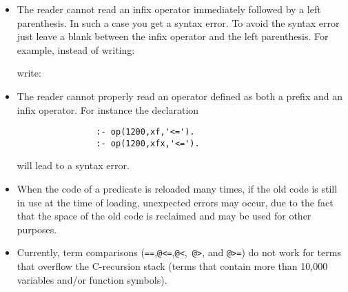\begin{itemize}
%
%
\item The reader cannot read an infix operator immediately followed 
      by a left parenthesis.  In such a case you get a syntax error.
      To avoid the syntax error just leave a blank between the infix
      operator and the left parenthesis.  For example, instead of 
      writing:


      \noindent
      write:

%
\item The reader cannot properly read an operator defined as both a
      prefix and an infix operator.  For instance the declaration 
      \begin{verbatim}
                :- op(1200,xf,'<=').
                :- op(1200,xfx,'<=').
      \end{verbatim}
      will lead to a syntax error.
%
\item When the code of a predicate is reloaded many times, if the old 
      code is still in use at the time of loading, unexpected errors may 
      occur, due to the fact that the space of the old code is reclaimed
      and may be used for other purposes.
\item Currently, term comparisons ({\tt ==},{\tt @<=},{\tt @<},{\tt
      @>}, and {\tt @>=}) do not work for terms that overflow the
      C-recursion stack (terms that contain more than 10,000 variables
      and/or function symbols).
\end{itemize}

